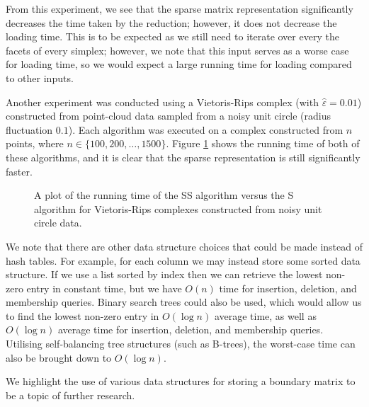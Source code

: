 From this experiment, we see that the sparse matrix representation significantly decreases the time taken by the reduction; however, it does not decrease the loading time. This is to be expected as we still need to iterate over every the facets of every simplex; however, we note that this input serves as a worse case for loading time, so we would expect a large running time for loading compared to other inputs.

Another experiment was conducted using a Vietoris-Rips complex (with $\hat\varepsilon = 0.01$) constructed from point-cloud data sampled from a noisy unit circle (radius fluctuation $0.1$). Each algorithm was executed on a complex constructed from $n$ points, where $n \in \{100, 200, \ldots, 1500\}$. Figure \ref{fig:speedups-1v2-circ-compute} shows the running time of both of these algorithms, and it is clear that the sparse representation is still significantly faster.

\begin{figure}
  \caption{A plot of the running time of the \textsc{SS} algorithm versus the \textsc{S} algorithm for Vietoris-Rips complexes constructed from noisy unit circle data.}
  \label{fig:speedups-1v2-circ-compute}
\end{figure}

We note that there are other data structure choices that could be made instead of hash tables. For example, for each column we may instead store some sorted data structure. If we use a list sorted by index then we can retrieve the lowest non-zero entry in constant time, but we have $O(n)$ time for insertion, deletion, and membership queries. Binary search trees could also be used, which would allow us to find the lowest non-zero entry in $O(\log n)$ average time, as well as $O(\log n)$ average time for insertion, deletion, and membership queries. Utilising self-balancing tree structures (such as B-trees), the worst-case time can also be brought down to $O(\log n)$.

We highlight the use of various data structures for storing a boundary matrix to be a topic of further research.
